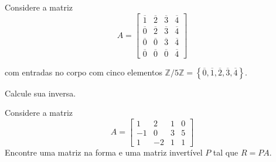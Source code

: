 \begin{questions}
  \question\label{exercício:11}

  Considere a matriz
  \[
    A=
    \begin{bmatrix}
      \overline{1} & \overline{2} & \overline{3} & \overline{4} \\
      \overline{0} & \overline{2} & \overline{3} & \overline{4} \\
      \overline{0} & \overline{0} & \overline{3} & \overline{4} \\
      \overline{0} & \overline{0} & \overline{0} & \overline{4}
    \end{bmatrix}
  \]

  com entradas no corpo com cinco elementos
  \begin{math}
    \mathbb{Z}/5\mathbb{Z}=
    \left\{
    \overline{0},
    \overline{1},
    \overline{2},
    \overline{3},
    \overline{4}
    \right\}
  \end{math}.

  Calcule sua inversa.

  \begin{solutionordottedlines}
  \end{solutionordottedlines}

  \question\label{exercício:12}

  Considere a matriz
  \[
    A=
    \begin{bmatrix}
      1  & 2  & 1 & 0 \\
      -1 & 0  & 3 & 5 \\
      1  & -2 & 1 & 1
    \end{bmatrix}
  \]
  Encontre uma matriz na forma e uma matriz invertível $P$ tal que
  $R=PA$.

  \begin{solutionordottedlines}
  \end{solutionordottedlines}
\end{questions}
